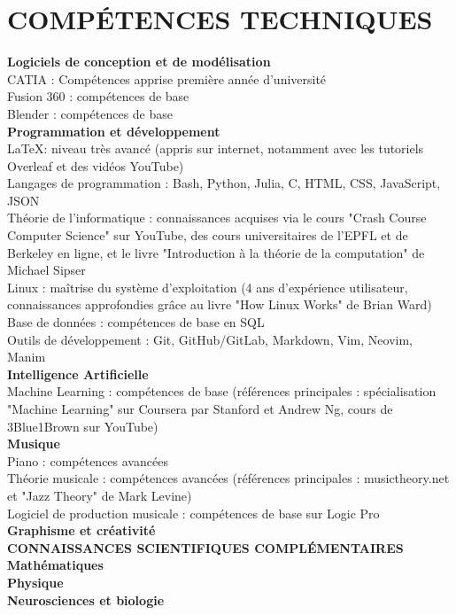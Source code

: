 \documentclass{article}
\begin{document}
\section{COMPÉTENCES TECHNIQUES}
\textbf{Logiciels de conception et de modélisation}\\
CATIA : Compétences apprise première année d'université\\
Fusion 360 : compétences de base\\
Blender : compétences de base\\

\textbf{Programmation et développement}\\
\LaTeX : niveau très avancé (appris sur internet, notamment avec les tutoriels Overleaf et des vidéos YouTube)\\
Langages de programmation : Bash, Python, Julia, C, HTML, CSS, JavaScript, JSON\\
Théorie de l'informatique : connaissances acquises via le cours "Crash Course Computer Science" sur YouTube, des cours universitaires de l'EPFL et de Berkeley en ligne, et le livre "Introduction à la théorie de la computation" de Michael Sipser\\
Linux : maîtrise du système d'exploitation (4 ans d'expérience utilisateur, connaissances approfondies grâce au livre "How Linux Works" de Brian Ward)\\
Base de données : compétences de base en SQL\\
Outils de développement : Git, GitHub/GitLab, Markdown, Vim, Neovim, Manim\\

\textbf{Intelligence Artificielle}\\
Machine Learning : compétences de base (références principales : spécialisation "Machine Learning" sur Coursera par Stanford et Andrew Ng, cours de 3Blue1Brown sur YouTube)\\

\textbf{Musique}\\
Piano : compétences avancées\\
Théorie musicale : compétences avancées (références principales : musictheory.net et "Jazz Theory" de Mark Levine)\\
Logiciel de production musicale : compétences de base sur Logic Pro\\

\textbf{Graphisme et créativité}\\

\textbf{CONNAISSANCES SCIENTIFIQUES COMPLÉMENTAIRES}\\
\textbf{Mathématiques}\\
\textbf{Physique}\\
\textbf{Neurosciences et biologie}
\end{document}
